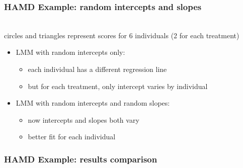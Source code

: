 \documentclass{beamer}
\begin{document}
\begin{frame}
    \frametitle{HAMD Example: random intercepts and slopes}
    \vspace{-2mm}
    \begin{center}
        \\\vspace{-2mm}
        \footnotesize circles and triangles represent scores for 6 individuals (2 for each treatment) \normalsize
    \end{center}
    \begin{itemize}\vspace{-2mm}\small
        \item LMM with random intercepts only:
        \begin{itemize}
            \item each individual has a different regression line
            \item but for each treatment, only intercept varies by individual
        \end{itemize}\vspace{1mm}
        \item LMM with random intercepts and random slopes:
        \begin{itemize}
            \item now intercepts and slopes both vary
            \item better fit for each individual
        \end{itemize}
    \end{itemize}
    \normalsize
\end{frame}

\begin{frame}
    \frametitle{HAMD Example: results comparison}
    \vspace{-2mm}
    \setlength{\tabcolsep}{3pt}
    \renewcommand{\arraystretch}{1.2}
    
    \renewcommand{\arraystretch}{1}
    \setlength{\tabcolsep}{6pt}  %
\end{frame}
\end{document}
